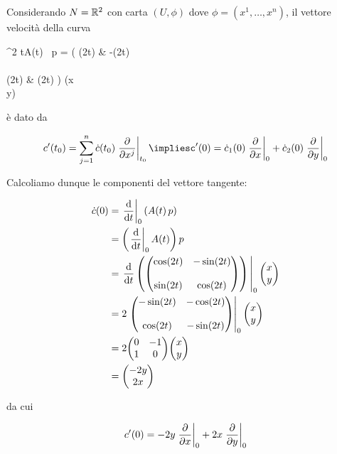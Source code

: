 Considerando $ N = \mathbb{R}^{2} $ con carta $ (U,\phi) $ dove $ \phi = (x^{1},\dots,x^{n}) $, il vettore velocità della curva

%
	{\R}{\R^{2}}%
	{t}{A(t) \, p = \mqty( \cos(2t) & -\sin(2t) \\\\ \sin(2t) & \cos(2t) ) \mqty(x \\ y)}

è dato da

\begin{equation}
	c'(t_{0}) = \sum_{j=1}^{n} \dot{c}(t_{0}) \eval{\pdv{x^{j}}}_{t_{0}}%
	\implies%
	c'(0) = \dot{c}_{1}(0) \eval{\pdv{x}}_{0} + \dot{c}_{2}(0) \eval{\pdv{y}}_{0}
\end{equation}

Calcoliamo dunque le componenti del vettore tangente:

\begin{align}
	\begin{split}
		\dot{c}(0) &= \eval{\dv{t}}_{0}(A(t) \, p)\\
		&= \left( \eval{\dv{t}}_{0} A(t) \right) p\\
		&= \eval{ \dv{t} \left( \mqty( \cos(2t) & -\sin(2t) \\\\ \sin(2t) & \cos(2t) ) \right) }_{0} \mqty(x \\ y)\\
		&= 2 \eval{ \mqty( -\sin(2t) & -\cos(2t) \\\\ \cos(2t) & -\sin(2t) ) }_{0} \mqty(x \\ y)\\
		&= 2 \mqty( 0 & -1 \\ 1 & 0 ) \mqty(x \\ y)\\
		&= \mqty(-2y \\ 2x)
	\end{split}
\end{align}

da cui

\begin{equation}
	c'(0) = -2y \eval{\pdv{x}}_{0} + 2x \eval{\pdv{y}}_{0}
\end{equation}

%

\newpage

%

\section{}\label{es2-11}

